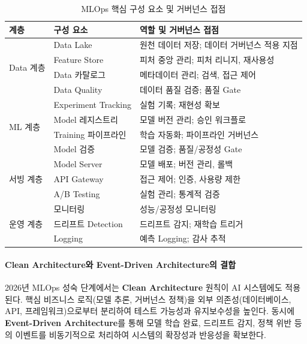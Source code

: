 \begin{table}[htbp]
\centering
\caption{MLOps 핵심 구성 요소 및 거버넌스 접점}
\label{tab:mlops_components}
\begin{tabularx}{\textwidth}{p{2.5cm}p{3cm}X}
\toprule
\textbf{계층} & \textbf{구성 요소} & \textbf{역할 및 거버넌스 접점} \\
\midrule
\multirow{4}{*}{Data 계층} &
Data Lake &
원천 데이터 저장; 데이터 거버넌스 적용 지점 \\
\cmidrule{2-3}
& Feature Store &
피처 중앙 관리; 피처 리니지, 재사용성 \\
\cmidrule{2-3}
& Data 카탈로그 &
메타데이터 관리; 검색, 접근 제어 \\
\cmidrule{2-3}
& Data Quality &
데이터 품질 검증; 품질 Gate \\
\midrule
\multirow{4}{*}{ML 계층} &
Experiment Tracking &
실험 기록; 재현성 확보 \\
\cmidrule{2-3}
& Model 레지스트리 &
모델 버전 관리; 승인 워크플로 \\
\cmidrule{2-3}
& Training 파이프라인 &
학습 자동화; 파이프라인 거버넌스 \\
\cmidrule{2-3}
& Model 검증 &
모델 검증; 품질/공정성 Gate \\
\midrule
\multirow{3}{*}{서빙 계층} &
Model Server &
모델 배포; 버전 관리, 롤백 \\
\cmidrule{2-3}
& API Gateway &
접근 제어; 인증, 사용량 제한 \\
\cmidrule{2-3}
& A/B Testing &
실험 관리; 통계적 검증 \\
\midrule
\multirow{3}{*}{운영 계층} &
모니터링 &
성능/공정성 모니터링 \\
\cmidrule{2-3}
& 드리프트 Detection &
드리프트 감지; 재학습 트리거 \\
\cmidrule{2-3}
& Logging &
예측 Logging; 감사 추적 \\
\bottomrule
\end{tabularx}
\end{table}


\paragraph{Clean Architecture와 Event-Driven Architecture의 결합}

2026년 MLOps 성숙 단계에서는 \textbf{Clean Architecture} 원칙이 AI 시스템에도 적용된다. 핵심 비즈니스 로직(모델 추론, 거버넌스 정책)을 외부 의존성(데이터베이스, API, 프레임워크)으로부터 분리하여 테스트 가능성과 유지보수성을 높인다. 동시에 \textbf{Event-Driven Architecture}를 통해 모델 학습 완료, 드리프트 감지, 정책 위반 등의 이벤트를 비동기적으로 처리하여 시스템의 확장성과 반응성을 확보한다.

